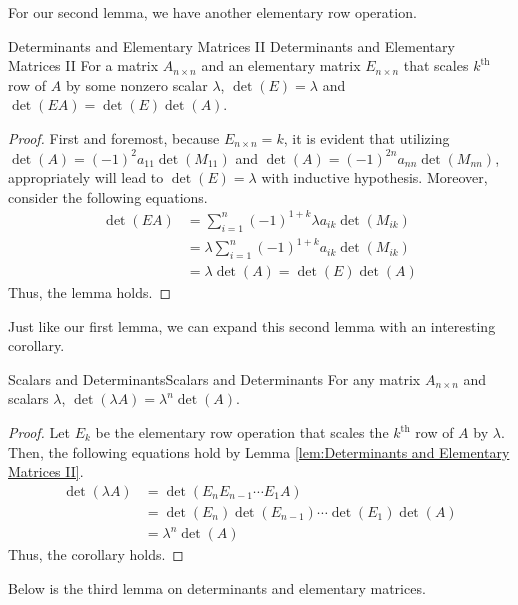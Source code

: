 \documentclass[../main.tex]{subfiles}
\begin{document}
For our second lemma, we have another elementary row operation.

\begin{lemma}{Determinants and Elementary Matrices II}
{Determinants and Elementary Matrices II}
For a matrix $A_{n \times n}$ and an elementary matrix
$E_{n \times n}$ that scales $k^\text{th}$ row of $A$ by some nonzero
scalar $\lambda$, $\det(E) = \lambda$ and $\det(EA) = \det(E)
\det(A)$.
\end{lemma}
\begin{proof}
First and foremost, because $E_{n \times n} = k$, it is evident
that utilizing $\det(A) = (-1)^2 a_{11} \det(M_{11})$ and $\det(A) =
(-1)^{2n} a_{nn} \det(M_{nn})$, appropriately will lead to $\det(E) =
\lambda$ with inductive hypothesis. Moreover, consider the following
equations.
\begin{align*}
    \det(EA)
    &= \sum_{i=1}^n (-1)^{1+k} \lambda a_{ik} \det(M_{ik}) \\
    &= \lambda \sum_{i=1}^n (-1)^{1+k} a_{ik} \det(M_{ik}) \\
    &= \lambda \det(A) = \det(E) \det(A)
\end{align*}
Thus, the lemma holds.
\end{proof}

Just like our first lemma, we can expand this second lemma with
an interesting corollary.

\begin{corollary}{Scalars and Determinants}{Scalars and Determinants}
For any matrix $A_{n \times n}$ and scalars $\lambda$,
$\det(\lambda A) = \lambda^n \det(A)$.
\end{corollary}
\begin{proof}
Let $E_k$ be the elementary row operation that scales the
$k^\text{th}$ row of $A$ by $\lambda$. Then, the following equations
hold by Lemma \ref{lem:Determinants and Elementary Matrices II}.
\begin{align*}
    \det(\lambda A)
    &= \det( E_n E_{n-1} \cdots E_1 A) \\
    &= \det(E_n) \det(E_{n-1}) \cdots \det(E_1) \det(A) \\
    &= \lambda^n \det(A)
\end{align*}
Thus, the corollary holds.
\end{proof}

Below is the third lemma on determinants and elementary matrices.
\end{document}
